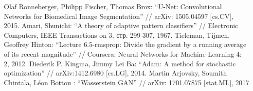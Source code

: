 \documentclass[a4paper]{article}
\begin{document}
\begin{thebibliography}{99}
		 Olaf Ronneberger, Philipp Fischer, Thomas Brox: ``U-Net: Convolutional Networks for Biomedical Image Segmentation'' // arXiv: 1505.04597 [cs.CV], 2015.
		 Amari, Shunichi: ``A theory of adaptive pattern classifiers'' // Electronic Computers, IEEE Transactions on 3, стр. 299-307, 1967.
		 Tieleman, Tijmen, Geoffrey Hinton: ``Lecture 6.5-rmsprop: Divide the gradient by a running average of its recent magnitude'' // Coursera: Neural Networks for Machine Learning 4: 2, 2012.
		 Diederik P. Kingma, Jimmy Lei Ba: ``Adam: A method for stochastic optimization'' // arXiv:1412.6980 [cs.LG], 2014.
		 Martin Arjovsky, Soumith Chintala, Léon Bottou : ``Wasserstein GAN'' // arXiv: 1701.07875 [stat.ML], 2017
	\end{thebibliography}
	
\end{document}
